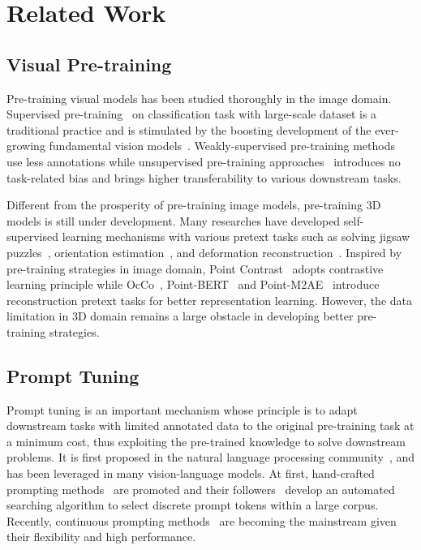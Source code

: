 \documentclass{article}
\begin{document}
\section{Related Work}

\subsection{Visual Pre-training}
Pre-training visual models has been studied thoroughly in the image domain. Supervised pre-training~\cite{dosovitskiy2020vit,DBLP:journals/corr/abs-2106-04560,carreira2017quo} on classification task with large-scale dataset is a traditional practice and is stimulated by the boosting development of the ever-growing fundamental vision models~\cite{he2016resnet,huang2017densenet,dosovitskiy2020vit,liu2021swin}. Weakly-supervised pre-training methods~\cite{tarvainen2017mean,berthelot2019mixmatch,xie2020self,pham2021meta} use less annotations while unsupervised pre-training approaches~\cite{he2020moco,chen2020mocov2,chen2020simclr,bao2021beit,he2022masked,grill2020bootstrap} introduces no task-related bias and brings higher transferability to various downstream tasks. 

Different from the prosperity of pre-training image models, pre-training 3D models is still under development. Many researches have developed self-supervised learning mechanisms with various pretext tasks such as solving jigsaw puzzles~\cite{sauder2019jigsaw}, orientation estimation~\cite{poursaeed2020orientation}, and deformation reconstruction~\cite{achituve2021deformation}. Inspired by pre-training strategies in image domain, Point Contrast~\cite{xie2020pointcontrast} adopts contrastive learning principle while OcCo~\cite{wang2021occo}, Point-BERT~\cite{yu2022pointbert} and Point-M2AE~\cite{zhang2022pointm2ae} introduce reconstruction pretext tasks for better representation learning. However, the data limitation in 3D domain remains a large obstacle in developing better pre-training strategies.

\subsection{Prompt Tuning}
\label{sec:prompt}

Prompt tuning is an important mechanism whose principle is to adapt downstream tasks with limited annotated data to the original pre-training task at a minimum cost, thus exploiting the pre-trained knowledge to solve downstream problems. It is first proposed in the natural language processing community~\cite{liu2021promptsurvey}, and has been leveraged in many vision-language models. At first, hand-crafted prompting methods~\cite{petroni2019lama, brown2020gpt3} are promoted and their followers~\cite{wallace2019advtrigger, shin2020autoprompt} develop an automated searching algorithm to select discrete prompt tokens within a large corpus. Recently, continuous prompting methods~\cite{li2021prefixtuning, lester2021prompttuning, liu2021ptuning, liu2021ptuningv2} are becoming the mainstream given their flexibility and high performance.
\end{document}
